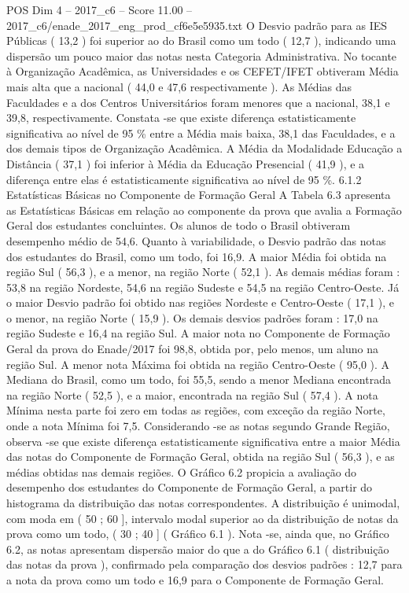 \begin{textsample}{POS Dim 4 – 2017\_c6 – Score 11.00 – 2017\_c6/enade\_2017\_eng\_prod\_cf6e5e5935.txt}
O Desvio padrão para as IES Públicas ( 13,2 ) foi superior ao do Brasil como um todo ( 12,7 ), indicando uma dispersão um pouco maior das notas nesta Categoria Administrativa.
No tocante à Organização Acadêmica, as Universidades e os CEFET/IFET obtiveram Média mais alta que a nacional ( 44,0 e 47,6 respectivamente ).
As Médias das Faculdades e a dos Centros Universitários foram menores que a nacional, 38,1 e 39,8, respectivamente.
Constata -se que existe diferença estatisticamente significativa ao nível de 95 \% entre a Média mais baixa, 38,1 das Faculdades, e a dos demais tipos de Organização Acadêmica.
A Média da Modalidade Educação a Distância ( 37,1 ) foi inferior à Média da Educação Presencial ( 41,9 ), e a diferença entre elas é estatisticamente significativa ao nível de 95 \%. 6.1.2 Estatísticas Básicas no Componente de Formação Geral A Tabela 6.3 apresenta as Estatísticas Básicas em relação ao componente da prova que avalia a Formação Geral dos estudantes concluintes.
Os alunos de todo o Brasil obtiveram desempenho médio de 54,6.
Quanto à variabilidade, o Desvio padrão das notas dos estudantes do Brasil, como um todo, foi 16,9.
A maior Média foi obtida na região Sul ( 56,3 ), e a menor, na região Norte ( 52,1 ).
As demais médias foram : 53,8 na região Nordeste, 54,6 na região Sudeste e 54,5 na região Centro-Oeste.
Já o maior Desvio padrão foi obtido nas regiões Nordeste e Centro-Oeste ( 17,1 ), e o menor, na região Norte ( 15,9 ).
Os demais desvios padrões foram : 17,0 na região Sudeste e 16,4 na região Sul.
A maior nota no Componente de Formação Geral da prova do Enade/2017 foi 98,8, obtida por, pelo menos, um aluno na região Sul.
A menor nota Máxima foi obtida na região Centro-Oeste ( 95,0 ).
A Mediana do Brasil, como um todo, foi 55,5, sendo a menor Mediana encontrada na região Norte ( 52,5 ), e a maior, encontrada na região Sul ( 57,4 ).
A nota Mínima nesta parte foi zero em todas as regiões, com exceção da região Norte, onde a nota Mínima foi 7,5.
Considerando -se as notas segundo Grande Região, observa -se que existe diferença estatisticamente significativa entre a maior Média das notas do Componente de Formação Geral, obtida na região Sul ( 56,3 ), e as médias obtidas nas demais regiões.
O Gráfico 6.2 propicia a avaliação do desempenho dos estudantes do Componente de Formação Geral, a partir do histograma da distribuição das notas correspondentes.
A distribuição é unimodal, com moda em ( 50 ; 60 ], intervalo modal superior ao da distribuição de notas da prova como um todo, ( 30 ; 40 ] ( Gráfico 6.1 ).
Nota -se, ainda que, no Gráfico 6.2, as notas apresentam dispersão maior do que a do Gráfico 6.1 ( distribuição das notas da prova ), confirmado pela comparação dos desvios padrões : 12,7 para a nota da prova como um todo e 16,9 para o Componente de Formação Geral.

\end{textsample}
